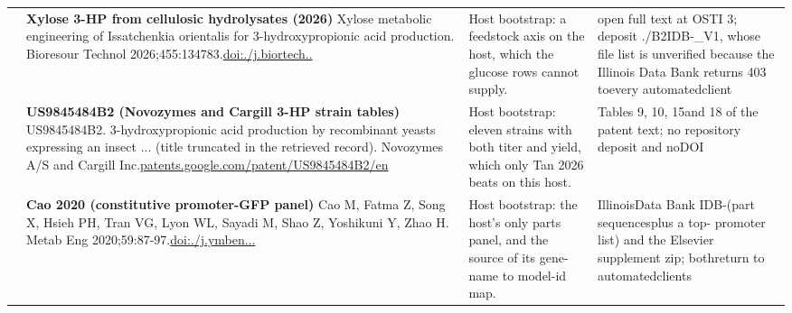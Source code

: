 \begin{landscape}
\begin{longtable}{@{}r@{\hspace{4pt}} L{78mm} L{72mm} L{76mm}@{}}
 & \textbf{Xylose 3-HP from cellulosic hydrolysates (2026)} \newline Xylose metabolic engineering of Issatchenkia orientalis for 3-hydroxypropionic acid production. Bioresour Technol 2026;455:134783.\newline \href{https://doi.org/10.1016/j.biortech.2026.134783}{doi:./\allowbreak j.\allowbreak biortec\allowbreak h..} & Host bootstrap: a feedstock axis on the host, which the glucose rows cannot supply. & open ful\allowbreak l text a\allowbreak t OSTI 3; \allowbreak deposit ./\allowbreak B2IDB-\_\allowbreak V1, who\allowbreak se file \allowbreak list is \allowbreak unverifi\allowbreak ed becau\allowbreak se the I\allowbreak llinois \allowbreak Data Ban\allowbreak k return\allowbreak s 403 to\allowbreak  every a\allowbreak utomated\allowbreak  client \\
 & \textbf{US9845484B2 (Novozymes and Cargill 3-HP strain tables)} \newline US9845484B2. 3-hydroxypropionic acid production by recombinant yeasts expressing an insect ... (title truncated in the retrieved record). Novozymes A/S and Cargill Inc.\newline \href{https://patents.google.com/patent/US9845484B2/en}{patents.\allowbreak google.\allowbreak com/\allowbreak patent/\allowbreak US98454\allowbreak 84B2/\allowbreak en} & Host bootstrap: eleven strains with both titer and yield, which only Tan 2026 beats on this host. & Tables 9\allowbreak , 10, 15\allowbreak  and 18 \allowbreak of the p\allowbreak atent te\allowbreak xt; no r\allowbreak epositor\allowbreak y deposi\allowbreak t and no\allowbreak  DOI \\
 & \textbf{Cao 2020 (constitutive promoter-GFP panel)} \newline Cao M, Fatma Z, Song X, Hsieh PH, Tran VG, Lyon WL, Sayadi M, Shao Z, Yoshikuni Y, Zhao H. Metab Eng 2020;59:87-97.\newline \href{https://doi.org/10.1016/j.ymben.2020.01.005}{doi:./\allowbreak j.\allowbreak ymben...} & Host bootstrap: the host's only parts panel, and the source of its gene-name to model-id map. & Illinois\allowbreak  Data Ba\allowbreak nk IDB-\allowbreak  (part s\allowbreak equences\allowbreak  plus a \allowbreak top- prom\allowbreak oter lis\allowbreak t) and t\allowbreak he Elsev\allowbreak ier supp\allowbreak lement z\allowbreak ip; both\allowbreak  return  to a\allowbreak utomated\allowbreak  clients \\

\end{longtable}
\end{landscape}
